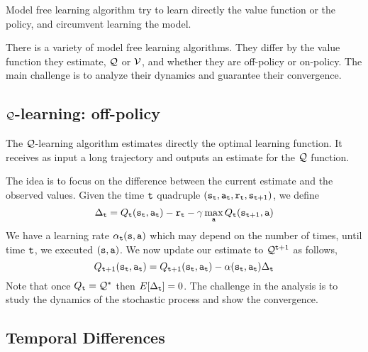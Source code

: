 Model free learning algorithm try to learn directly the value
function or the policy, and circumvent learning the model.

There is a variety of model free learning algorithms. They differ by
the value function they estimate, $\mathcal{Q}$ or $\mathcal{V}$, and whether
they are off-policy or on-policy. The main challenge is to analyze
their dynamics and guarantee their convergence.

\subsection{$\mathcal{Q}$-learning: off-policy}

The $\mathcal{Q}$-learning algorithm estimates directly the optimal
learning function. It receives as input a long trajectory and
outputs an estimate for the $\mathcal{Q}$ function.

The idea is to focus on the difference between the current estimate
and the observed values. Given the time ${\tt t}$ quadruple
$({\tt s}_{\tt t},{\tt a}_{\tt t},{\tt r}_{\tt t},{\tt s}_{{\tt t}+1})$,
we define
\[
\Delta_{\tt t}= Q_{\tt t}({\tt s}_{\tt t},{\tt a}_{\tt t}) -
{\tt r}_{\tt t} - \gamma \max_{\tt a}
Q_{\tt t}({\tt s}_{{\tt t}+1},{\tt a})
\]
We have a learning rate $\alpha_{\tt t}({\tt s},{\tt a})$ which may
depend on the number of times, until time ${\tt t}$, we executed
$({\tt s},{\tt a})$. We now update our estimate to
$\mathcal{Q}^{{\tt t}+1}$ as follows,
\[
Q_{{\tt t}+1}({\tt s}_{\tt t},{\tt a}_{\tt t})=Q_{{\tt t}+1}({\tt s}_{\tt t},{\tt a}_{\tt t})-\alpha({\tt s}_{\tt t},{\tt a}_{\tt t})\Delta_{\tt t}
\]
Note that once $Q_{\tt t}=\mathcal{Q}^*$ then $E[\Delta_{\tt t}]=0$. The
challenge in the analysis is to study the dynamics of the stochastic
process and show the convergence.



\subsection{Temporal Differences}

